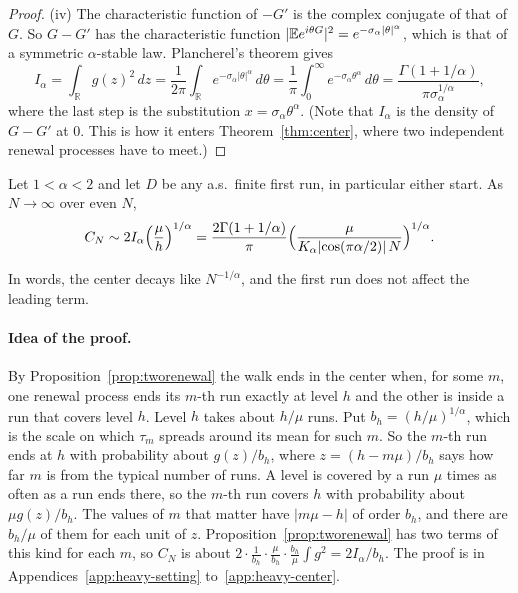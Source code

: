 \begin{proof}
(iv) The characteristic function of $-G'$ is the complex conjugate of that
of $G$. So $G-G'$ has the characteristic function
$\lvert\mathbb{E} e^{i\theta G}\rvert^2=e^{-\sigma_\alpha\lvert\theta\rvert^\alpha}$,
which is that of a symmetric $\alpha$-stable law. Plancherel's theorem gives
\[
 I_\alpha=\int_{\mathbb R}g(z)^2\,dz
 =\frac1{2\pi}\int_{\mathbb R}e^{-\sigma_\alpha\lvert\theta\rvert^\alpha}\,d\theta
 =\frac1\pi\int_0^\infty e^{-\sigma_\alpha\theta^\alpha}\,d\theta
 =\frac{\Gamma(1+1/\alpha)}{\pi\sigma_\alpha^{1/\alpha}} ,
\]
where the last step is the substitution $x=\sigma_\alpha\theta^\alpha$. (Note
that $I_\alpha$ is the density of $G-G'$ at $0$. This is how it enters
Theorem~\ref{thm:center}, where two independent renewal processes have to
meet.)
\end{proof}

\begin{theorem}\label{thm:center}
Let $1<\alpha<2$ and let $D$ be any a.s.\ finite first run, in particular
either start. As $N\to\infty$ over even $N$,
\[
 C_N\sim2I_\alpha\Bigl(\frac{\mu}{h}\Bigr)^{1/\alpha}
 =\frac{2\Gamma(1+1/\alpha)}{\pi}\Bigl(\frac{\mu}{K_\alpha\lvert\cos(\pi
 \alpha/2)\rvert\,N}\Bigr)^{1/\alpha}.
\]
\end{theorem}

In words, the center decays like $N^{-1/\alpha}$, and the first run does not
affect the leading term.

\paragraph{Idea of the proof.}
By Proposition~\ref{prop:tworenewal} the walk ends in the center when, for
some $m$, one renewal process ends its $m$-th run exactly at level $h$ and
the other is inside a run that covers level $h$. Level $h$ takes about
$h/\mu$ runs. Put $b_h=(h/\mu)^{1/\alpha}$, which is the scale on which
$\tau_m$ spreads around its mean for such $m$. So the $m$-th run ends at $h$
with probability about $g(z)/b_h$, where $z=(h-m\mu)/b_h$ says how far $m$ is
from the typical number of runs. A level is covered by a run $\mu$ times as
often as a run ends there, so the $m$-th run covers $h$ with probability
about $\mu g(z)/b_h$. The values of $m$ that matter have
$\lvert m\mu-h\rvert$ of order $b_h$, and there are $b_h/\mu$ of them for
each unit of $z$. Proposition~\ref{prop:tworenewal} has two terms of this
kind for each $m$, so $C_N$ is about
$2\cdot\frac1{b_h}\cdot\frac\mu{b_h}\cdot\frac{b_h}\mu\int g^2=2I_\alpha/b_h$.
The proof is in Appendices~\ref{app:heavy-setting} to~\ref{app:heavy-center}.

